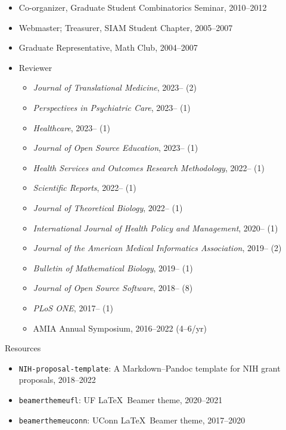 \documentclass[10pt,a4paper]{article}
\begin{document}
\begin{itemize}[label=$\circ$,nolistsep]
\item
Co-organizer, Graduate Student Combinatorics Seminar, 2010--2012
\item
Webmaster; Treasurer, SIAM Student Chapter, 2005--2007
\item
Graduate Representative, Math Club, 2004--2007
\item
Reviewer
\begin{itemize}[label=$\circ$,nolistsep]
\item
{\itshape Journal of Translational Medicine}, 2023-- (2)
\item
{\itshape Perspectives in Psychiatric Care}, 2023-- (1)
\item
{\itshape Healthcare}, 2023-- (1)
\item
{\itshape Journal of Open Source Education}, 2023-- (1)
\item
{\itshape Health Services and Outcomes Research Methodology}, 2022-- (1)
\item
{\itshape Scientific Reports}, 2022-- (1)
\item
{\itshape Journal of Theoretical Biology}, 2022-- (1)
\item
{\itshape International Journal of Health Policy and Management}, 2020-- (1)
\item
{\itshape Journal of the American Medical Informatics Association}, 2019-- (2)
\item
{\itshape Bulletin of Mathematical Biology}, 2019-- (1)
\item
{\itshape Journal of Open Source Software}, 2018-- (8)
\item
{\itshape PLoS ONE}, 2017-- (1)
\item
AMIA Annual Symposium, 2016--2022 (4--6/yr)
\end{itemize}
\end{itemize}

\vspace{.25cm}
{\sc Resources}
\begin{itemize}[label=$\circ$,nolistsep]
\item
{\tt\small NIH-proposal-template}: A Markdown--Pandoc template for NIH grant proposals, 2018--2022
\item
{\tt\small beamerthemeufl}: UF \LaTeX\ {\sffamily Beamer} theme, 2020--2021
\item
{\tt\small beamerthemeuconn}: UConn \LaTeX\ {\sffamily Beamer} theme, 2017--2020
\end{itemize}
\end{document}
